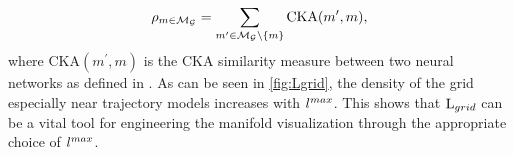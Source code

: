 \documentclass[letterpaper]{article} %
\begin{document}

        \begin{equation}
            \rho_{m \in \mathcal{M_G}} = \sum_{m^\prime \in \mathcal{M_G} \setminus \{m\}} \text{CKA}(m^\prime, m),
        \end{equation}
        where $\text{CKA}(m^\prime, m)$ is the $\text{CKA}$ similarity measure between two neural networks as defined in \cite{kornblith2019similarity}.
        As can be seen in \cref{fig:Lgrid}, the density of the grid especially near trajectory models increases with $l^{max}$. 
        This shows that $\text{L}_{grid}$ can be a vital tool for engineering the manifold visualization through the appropriate choice of $l^{max}$.
\end{document}

